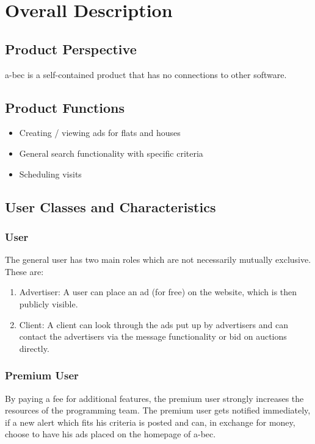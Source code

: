 \section{Overall Description}
\subsection{Product Perspective}
	a-bec is a self-contained product that has no connections to other software.	

\subsection{Product Functions}
\begin{itemize}
	\item Creating / viewing ads for flats and houses
	\item General search functionality with specific criteria
	\item Scheduling visits
	\end{itemize}

\subsection{User Classes and Characteristics}
	\subsubsection{User}
		The general user has two main roles which are not necessarily mutually exclusive. These are: \\
		\begin{enumerate}
		\item 		Advertiser: A user can place an ad (for free) on the website, which is then publicly visible.
		\item		Client: A client can look through the ads put up by advertisers and can contact the advertisers via the message functionality or bid on auctions directly.
		\end{enumerate}
		
	\subsubsection{Premium User}
		By paying a fee for additional features, the premium user strongly increases the resources 
		of the programming team. The premium user gets notified immediately, if a new alert which fits his criteria is posted and can, in exchange for money, choose to have his ads placed on the homepage of a-bec.
		

